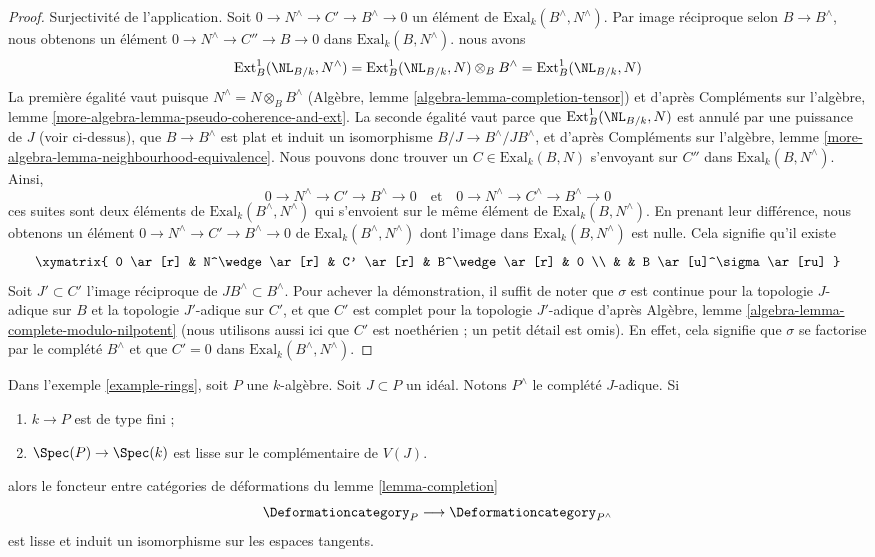 \begin{proof}
\medskip\noindent
Surjectivité de l'application. Soit $0 \to N^\wedge \to C' \to B^\wedge \to 0$
un élément de $\text{Exal}_k(B^\wedge, N^\wedge)$.
Par image réciproque selon $B \to B^\wedge$, nous obtenons un élément
$0 \to N^\wedge \to C'' \to B \to 0$ dans
$\text{Exal}_k(B, N^\wedge)$.
nous avons
$$
\text{Ext}^1_B(\NL_{B/k}, N^\wedge) =
\text{Ext}^1_B(\NL_{B/k}, N) \otimes_B B^\wedge =
\text{Ext}^1_B(\NL_{B/k}, N)
$$
La première égalité vaut puisque $N^\wedge = N \otimes_B B^\wedge$
(Algèbre, lemme \ref{algebra-lemma-completion-tensor})
et d'après
Compléments sur l'algèbre, lemme \ref{more-algebra-lemma-pseudo-coherence-and-ext}.
La seconde égalité vaut parce que $\text{Ext}^1_B(\NL_{B/k}, N)$
est annulé par une puissance de $J$ (voir ci-dessus), que $B \to B^\wedge$ est plat et induit
un isomorphisme $B/J \to B^\wedge/JB^\wedge$, et d'après
Compléments sur l'algèbre, lemme \ref{more-algebra-lemma-neighbourhood-equivalence}.
Nous pouvons donc trouver un $C \in \text{Exal}_k(B, N)$ s'envoyant sur $C''$ dans
$\text{Exal}_k(B, N^\wedge)$.
Ainsi,
$$
0 \to N^\wedge \to C' \to B^\wedge \to 0
\quad\text{et}\quad
0 \to N^\wedge \to C^\wedge \to B^\wedge \to 0
$$
ces suites sont deux éléments de $\text{Exal}_k(B^\wedge, N^\wedge)$
qui s'envoient sur le même élément de $\text{Exal}_k(B, N^\wedge)$.
En prenant leur différence, nous obtenons un élément
$0 \to N^\wedge \to C' \to B^\wedge \to 0$ de
$\text{Exal}_k(B^\wedge, N^\wedge)$
dont l'image dans $\text{Exal}_k(B, N^\wedge)$ est nulle.
Cela signifie qu'il existe
$$
\xymatrix{
0 \ar[r] &
N^\wedge \ar[r] &
C' \ar[r] &
B^\wedge \ar[r] & 0 \\
& & B \ar[u]^\sigma \ar[ru]
}
$$
Soit $J' \subset C'$ l'image réciproque de $JB^\wedge \subset B^\wedge$.
Pour achever la démonstration, il suffit de noter que
$\sigma$ est continue pour la topologie $J$-adique sur $B$
et la topologie $J'$-adique sur $C'$, et que $C'$ est complet pour la topologie $J'$-adique d'après
Algèbre, lemme \ref{algebra-lemma-complete-modulo-nilpotent}
(nous utilisons aussi ici que $C'$ est noethérien ; un petit détail est omis).
En effet, cela signifie que $\sigma$ se factorise par le
complété $B^\wedge$ et que $C' = 0$ dans $\text{Exal}_k(B^\wedge, N^\wedge)$.
\end{proof}

\begin{lemma}
\label{lemma-smooth-completion}
Dans l'exemple \ref{example-rings}, soit $P$ une $k$-algèbre.
Soit $J \subset P$ un idéal.
Notons $P^\wedge$ le complété $J$-adique. Si
\begin{enumerate}
\item $k \to P$ est de type fini ;
\item $\Spec(P) \to \Spec(k)$ est lisse sur le complémentaire de $V(J)$.
\end{enumerate}
alors le foncteur entre catégories de déformations du
lemme \ref{lemma-completion}
$$
\Deformationcategory_P \longrightarrow \Deformationcategory_{P^\wedge}
$$
est lisse et induit un isomorphisme sur les espaces tangents.
\end{lemma}

